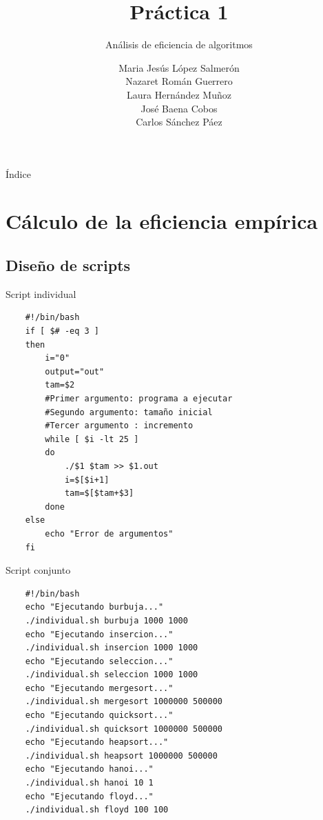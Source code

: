 \documentclass{beamer}
\title{Práctica 1}
\subtitle{Análisis de eficiencia de algoritmos}
\author{Maria Jesús López Salmerón \\ Nazaret Román Guerrero \\ Laura Hernández Muñoz \\ José Baena Cobos  \\ Carlos Sánchez Páez}
\begin{document}
\begin{frame}
  \titlepage
\end{frame}

\begin{frame}{Índice}
  \tableofcontents
\end{frame}

\section{Cálculo de la eficiencia empírica}

\subsection{Diseño de scripts}

\begin{frame}[fragile]{Script individual}

\begin{verbatim}
	#!/bin/bash
	if [ $# -eq 3 ]
	then
		i="0"
		output="out"
		tam=$2
		#Primer argumento: programa a ejecutar
		#Segundo argumento: tamaño inicial
		#Tercer argumento : incremento
		while [ $i -lt 25 ]
		do
			./$1 $tam >> $1.out
			i=$[$i+1]
			tam=$[$tam+$3]
		done
	else
		echo "Error de argumentos"
	fi
\end{verbatim}  
\end{frame}

\begin{frame}[fragile]{Script conjunto}

\begin{verbatim}
	#!/bin/bash
	echo "Ejecutando burbuja..."
	./individual.sh burbuja 1000 1000
	echo "Ejecutando insercion..."
	./individual.sh insercion 1000 1000
	echo "Ejecutando seleccion..."
	./individual.sh seleccion 1000 1000
	echo "Ejecutando mergesort..."
	./individual.sh mergesort 1000000 500000
	echo "Ejecutando quicksort..."
	./individual.sh quicksort 1000000 500000
	echo "Ejecutando heapsort..."
	./individual.sh heapsort 1000000 500000
	echo "Ejecutando hanoi..."
	./individual.sh hanoi 10 1
	echo "Ejecutando floyd..."
	./individual.sh floyd 100 100
\end{verbatim}  
\end{frame}
\end{document}
